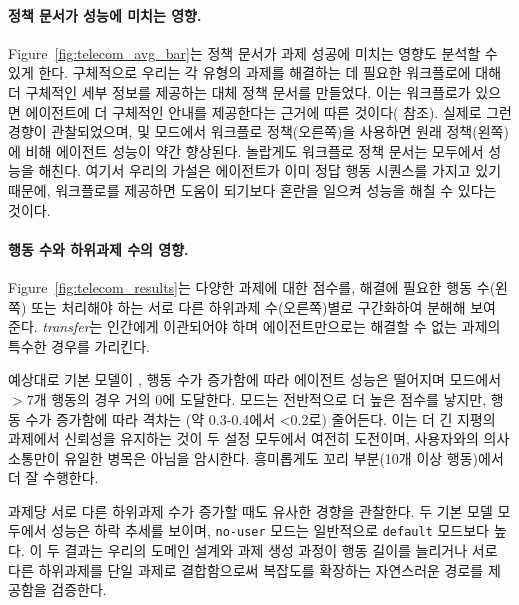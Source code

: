 \paragraph{정책 문서가 성능에 미치는 영향.}
Figure~\ref{fig:telecom_avg_bar}는 정책 문서가 과제 성공에 미치는 영향도 분석할 수 있게 한다. 구체적으로 우리는 각 유형의 과제를 해결하는 데 필요한 워크플로에 대해 더 구체적인 세부 정보를 제공하는 대체 정책 문서를 만들었다. 이는 워크플로가 있으면 에이전트에 더 구체적인 안내를 제공한다는 근거에 따른 것이다( 참조). 실제로 그런 경향이 관찰되었으며, \basemode 및 \solomode 모드에서 워크플로 정책(오른쪽)을 사용하면 원래 정책(왼쪽)에 비해 에이전트 성능이 약간 향상된다. 놀랍게도 워크플로 정책 문서는  \ofourmodelshort 모두에서 \gtmode 성능을 해친다. 여기서 우리의 가설은 에이전트가 이미 정답 행동 시퀀스를 가지고 있기 때문에, 워크플로를 제공하면 도움이 되기보다 혼란을 일으켜 성능을 해칠 수 있다는 것이다.
 
\paragraph{행동 수와 하위과제 수의 영향.}



Figure~\ref{fig:telecom_results}는  다양한 과제에 대한 \passone 점수를, 해결에 필요한 행동 수(왼쪽) 또는 처리해야 하는 서로 다른 하위과제 수(오른쪽)별로 구간화하여 분해해 보여 준다. \textit{transfer}는 인간에게 이관되어야 하며 에이전트만으로는 해결할 수 없는 과제의 특수한 경우를 가리킨다. 

예상대로 기본 모델이  , 행동 수가 증가함에 따라 에이전트 성능은 떨어지며 \basemode 모드에서 $>7$개 행동의 경우 거의 0에 도달한다. \solomode 모드는 전반적으로 더 높은 점수를 낳지만, 행동 수가 증가함에 따라 격차는 (약 0.3-0.4에서 <0.2로) 줄어든다. 이는 더 긴 지평의 과제에서 신뢰성을 유지하는 것이 두 설정 모두에서 여전히 도전이며, 사용자와의 의사소통만이 유일한 병목은 아님을 암시한다. 흥미롭게도  꼬리 부분(10개 이상 행동)에서   더 잘 수행한다.

과제당 서로 다른 하위과제 수가 증가할 때도 유사한 경향을 관찰한다. 두 기본 모델 모두에서 성능은 하락 추세를 보이며, \texttt{no-user} 모드는 일반적으로 \texttt{default} 모드보다 높다. 이 두 결과는 우리의 도메인 설계와 과제 생성 과정이 행동 길이를 늘리거나 서로 다른 하위과제를 단일 과제로 결합함으로써 복잡도를 확장하는 자연스러운 경로를 제공함을 검증한다.


